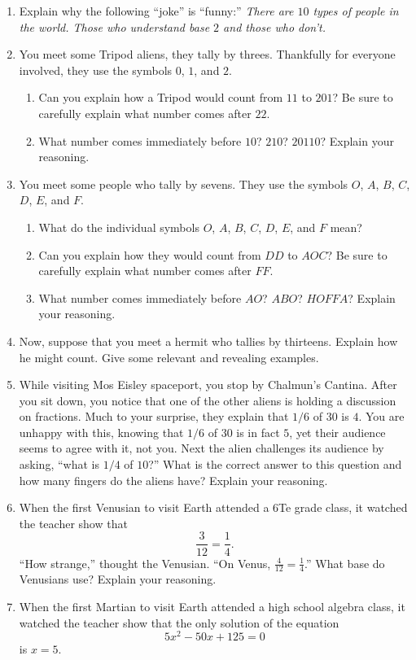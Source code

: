 \begin{problems}
\begin{enumerate}
\item Explain why the following ``joke'' is ``funny:'' \textit{There
  are $10$ types of people in the world. Those who understand base $2$
  and those who don't.}
\item You meet some Tripod aliens, they tally by threes. Thankfully
  for everyone involved, they use the symbols $0$, $1$, and $2$. 
\begin{enumerate}
\item Can you explain how a Tripod would count from $11$ to $201$? Be
  sure to carefully explain what number comes after $22$.
\item What number comes immediately before $10$?  $210$? $20110$?
  Explain your reasoning.
\end{enumerate}
\item You meet some people who tally by sevens. They use the symbols
  $O$, $A$, $B$, $C$, $D$, $E$, and $F$. 
\begin{enumerate}
\item What do the individual symbols $O$, $A$, $B$, $C$, $D$, $E$, and
  $F$ mean?
\item Can you explain how they would count from $DD$ to $AOC$? Be sure
  to carefully explain what number comes after $FF$.
\item What number comes immediately before $AO$?  $ABO$? $HOFFA$?
  Explain your reasoning.
\end{enumerate}
\item Now, suppose that you meet a hermit who tallies by
  thirteens. Explain how he might count. Give some relevant and
  revealing examples.
\item While visiting Mos Eisley spaceport, you stop by Chalmun's
  Cantina. After you sit down, you notice that one of the other aliens
  is holding a discussion on fractions. Much to your surprise, they
  explain that $1/6$ of $30$ is $4$. You are unhappy with this,
  knowing that $1/6$ of $30$ is in fact $5$, yet their audience seems
  to agree with it, not you. Next the alien challenges its audience by
  asking, ``what is $1/4$ of $10$?'' What is the correct answer to
  this question and how many fingers do the aliens have? Explain your
  reasoning.
\item When the first Venusian to visit Earth attended a 6Te grade
  class, it watched the teacher show that
\[
\frac{3}{12} = \frac{1}{4}.
\]
``How strange,'' thought the Venusian. ``On Venus, $\frac{4}{12} =
\frac{1}{4}$.'' What base do Venusians use? Explain your reasoning.
\item When the first Martian to visit Earth attended a high school
  algebra class, it watched the teacher show that the only solution of
  the equation
\[
5x^2-50x+125 = 0
\]
is $x = 5$.


\end{enumerate}
\end{problems}

